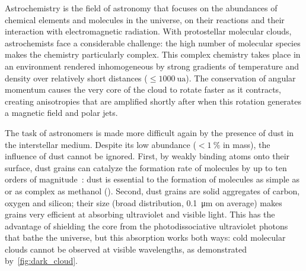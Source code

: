 Astrochemistry is the field of astronomy that focuses on the abundances of chemical elements and molecules in the universe, on their reactions and their interaction with electromagnetic radiation.
With protostellar molecular clouds, astrochemists face a considerable challenge:
the high number of molecular species makes the chemistry particularly complex.
This complex chemistry takes place in an environment rendered inhomogeneous by strong gradients of temperature and density over relatively short distances ($\le \SI{1000}{\astronomicalunit}$).
The conservation of angular momentum causes the very core of the cloud to rotate faster as it contracts, creating anisotropies that are amplified shortly after when this rotation generates a magnetic field and polar jets.

The task of astronomers is made more difficult again by the presence of dust in the interstellar medium.
Despite its low abundance ($< \SI{1}{\percent}$ in mass), the influence of dust cannot be ignored.
First, by weakly binding atoms onto their surface,
dust grains can catalyze the formation rate of molecules by up to ten orders of magnitude~\parencite{dulieu2013micron}:
dust is essential to the formation of molecules as simple as~ or as complex as methanol ().
Second, dust grains are solid aggregates of carbon, oxygen and silicon;
their size (broad distribution, \SI{0.1}{\micro\meter} on average) makes grains very efficient at absorbing ultraviolet and visible light.
This has the advantage of shielding the core from the photodissociative ultraviolet photons that bathe the universe, but this absorption works both ways:
cold molecular clouds cannot be observed at visible wavelengths, as demonstrated by~\cref{fig:dark_cloud}.

